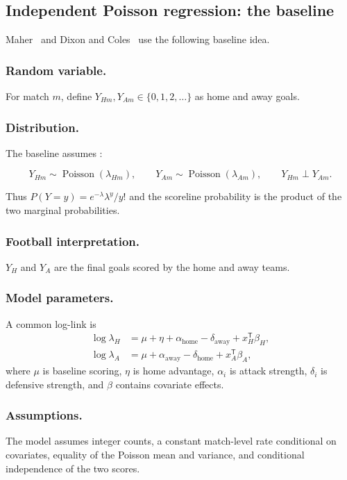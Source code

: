 \documentclass[11pt,a4paper]{amsart}
\numberwithin{equation}{section}
\begin{document}
\subsection*{Independent Poisson regression: the baseline}
Maher~\cite{maher1982} and Dixon and Coles~\cite{dixoncoles1997} use the following baseline idea.

\subsubsection*{Random variable.} For match $m$, define $Y_{Hm},Y_{Am}\in\{0,1,2,\ldots\}$ as home and away goals.
\subsubsection*{Distribution.} The baseline assumes : 

\begin{equation}
Y_{Hm}\sim\operatorname{Poisson}(\lambda_{Hm}),\qquad Y_{Am}\sim\operatorname{Poisson}(\lambda_{Am}),\qquad Y_{Hm}\perp Y_{Am}.
\end{equation}

Thus $P(Y=y)=e^{-\lambda}\lambda^y/y!$ and the scoreline probability is the product of the two marginal probabilities.

\subsubsection*{Football interpretation.} $Y_H$ and $Y_A$ are the final goals scored by the home and away teams.

\subsubsection*{Model parameters.} A common log-link is
\begin{align}
\log\lambda_H&=\mu+\eta+\alpha_{\text{home}}-\delta_{\text{away}}+x_H^{\mathsf T}\beta_H,\\
\log\lambda_A&=\mu+\alpha_{\text{away}}-\delta_{\text{home}}+x_A^{\mathsf T}\beta_A,
\end{align}
where $\mu$ is baseline scoring, $\eta$ is home advantage, $\alpha_i$ is attack strength, $\delta_i$ is defensive strength, and $\beta$ contains covariate effects.

\subsubsection*{Assumptions.} The model assumes integer counts, a constant match-level rate conditional on covariates, equality of the Poisson mean and variance, and conditional independence of the two scores.
\end{document}
